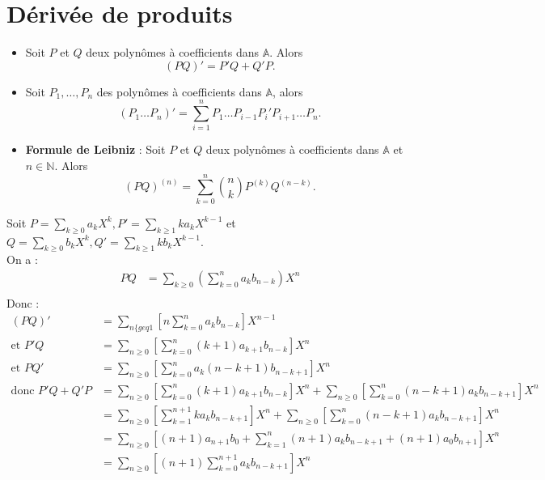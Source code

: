 \documentclass[../main.tex]{subfiles}
\begin{document}
\section{Dérivée de produits}

\begin{tcolorbox}[title=Propostion 13.26, title filled=false, colframe=lightblue, colback=lightblue!10!white]
    \begin{itemize}
        \item Soit $P$ et $Q$ deux polynômes à coefficients dans $\mathbb{A}$. Alors
        $$(PQ)' = P'Q + Q'P.$$

        \item Soit $P_1, \ldots, P_n$ des polynômes à coefficients dans $\mathbb{A}$, alors
        $$(P_1 \ldots P_n)' = \sum_{i=1}^{n} P_1 \ldots P_{i-1} P_i' P_{i+1} \ldots P_n.$$
    
        \item \textbf{Formule de Leibniz} : Soit $P$ et $Q$ deux polynômes à coefficients dans $\mathbb{A}$ et $n \in \mathbb{N}$. Alors
        $$(PQ)^{(n)} = \sum_{k=0}^{n} \binom{n}{k} P^{(k)} Q^{(n-k)}.$$
    \end{itemize}
\end{tcolorbox}

Soit $P = \sum\limits_{k \geq 0} a_k X^k, P' = \sum\limits_{k \geq 1} ka_kX^{k-1}$ et $Q = \sum\limits_{k \geq 0} b_k X^k, Q' = \sum\limits_{k \geq 1} kb_kX^{k-1}$. \\
On a : 
\begin{align*}
    PQ &= \sum_{k \geq 0} \left( \sum_{k=0}^{n} a_k b_{n-k} \right) X^n \\
\end{align*}
Donc : 
\begin{align*}
    (PQ)' &= \sum_{n \{geq 1} \left[ n \sum_{k=0}^{n} a_k b_{n-k} \right] X^{n-1} \\
    \text{et } P'Q &= \sum_{n \geq 0} \left[ \sum_{k=0}^{n} (k+1)a_{k+1} b_{n-k} \right] X^n \\
    \text{et } PQ' &= \sum_{n \geq 0} \left[ \sum_{k=0}^{n} a_k (n-k+1)b_{n-k+1} \right] X^n \\
    \text{donc } P'Q + Q'P &= \sum_{n \geq 0} \left[ \sum_{k=0}^{n} (k+1)a_{k+1} b_{n-k} \right]X^n + \sum_{n \geq 0} \left[ \sum_{k=0}^{n} (n-k+1)a_k b_{n-k+1} \right] X^n \\
    &= \sum_{n \geq 0} \left[ \sum_{k=1}^{n+1} k a_{k} b_{n-k+1} \right] X^n + \sum_{n \geq 0} \left[ \sum_{k=0}^{n} (n-k+1) a_k b_{n-k+1} \right] X^n \\
    &= \sum_{n \geq 0} \left[ (n+1) a_{n+1} b_0 + \sum_{k=1}^{n} (n+1) a_k b_{n-k+1} + (n+1) a_0 b_{n+1} \right] X^n \\
    &= \sum_{n \geq 0} \left[ (n+1) \sum_{k=0}^{n+1} a_k b_{n-k+1} \right] X^n
\end{align*}
\end{document}
